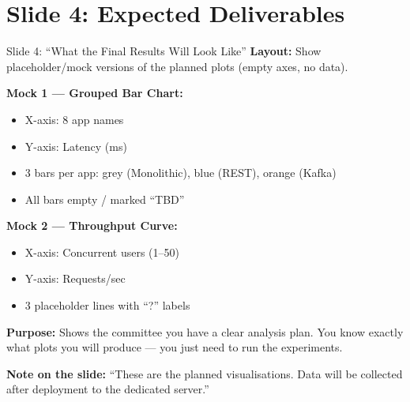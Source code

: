 \documentclass[12pt,a4paper]{article}
\begin{document}
\section{Slide 4: Expected Deliverables}

\begin{slidebox}{Slide 4: ``What the Final Results Will Look Like''}
\textbf{Layout:} Show placeholder/mock versions of the planned plots (empty axes, no data).

\textbf{Mock 1 --- Grouped Bar Chart:}
\begin{itemize}[nosep]
  \item X-axis: 8 app names
  \item Y-axis: Latency (ms)
  \item 3 bars per app: grey (Monolithic), blue (REST), orange (Kafka)
  \item All bars empty / marked ``TBD''
\end{itemize}

\textbf{Mock 2 --- Throughput Curve:}
\begin{itemize}[nosep]
  \item X-axis: Concurrent users (1--50)
  \item Y-axis: Requests/sec
  \item 3 placeholder lines with ``?'' labels
\end{itemize}

\textbf{Purpose:} Shows the committee you have a clear analysis plan. You know exactly what plots you will produce --- you just need to run the experiments.

\textbf{Note on the slide:} ``These are the planned visualisations. Data will be collected after deployment to the dedicated server.''
\end{slidebox}
\end{document}
